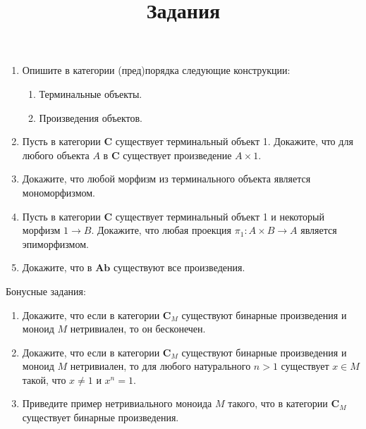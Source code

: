 \documentclass[draft]{article}
\newcommand{\cat}[1]{\mathbf{#1}}
\renewcommand{\C}{\cat{C}}
\newcommand{\Ab}{\cat{Ab}}
\begin{document}
\title{Задания}
\maketitle

\begin{enumerate}

\item Опишите в категории (пред)порядка следующие конструкции:
\begin{enumerate}
\item Терминальные объекты.
\item Произведения объектов.
\end{enumerate}

\item Пусть в категории $\C$ существует терминальный объект 1.
Докажите, что для любого объекта $A$ в $\C$ существует произведение $A \times 1$.

\item Докажите, что любой морфизм из терминального объекта является мономорфизмом.

\item Пусть в категории $\C$ существует терминальный объект 1 и некоторый морфизм $1 \to B$.
Докажите, что любая проекция $\pi_1 : A \times B \to A$ является эпиморфизмом.

\item Докажите, что в $\Ab$ существуют все произведения.

\end{enumerate}

Бонусные задания:

\begin{enumerate}

\item Докажите, что если в категории $\C_M$ существуют бинарные произведения и моноид $M$ нетривиален, то он бесконечен.

\item Докажите, что если в категории $\C_M$ существуют бинарные произведения и моноид $M$ нетривиален, то для любого натурального $n > 1$ существует $x \in M$ такой, что $x \neq 1$ и $x^n = 1$.

\item Приведите пример нетривиального моноида $M$ такого, что в категории $\C_M$ существует бинарные произведения.

\end{enumerate}
\end{document}
